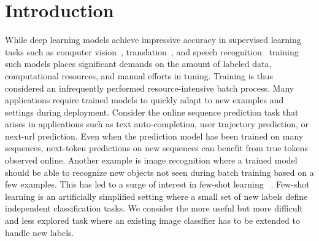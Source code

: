 \documentclass[letterpaper]{article} %
\begin{document}


\section{Introduction}

While deep learning models achieve impressive accuracy in supervised learning tasks such as computer vision~\cite{Krizhevsky_imagenetclassification},  translation~\cite{WuGNMT16}, and speech recognition~\cite{Yu14ASR} training such models places significant demands on the  amount of labeled data, computational resources, and manual efforts in tuning.  Training is thus considered an infrequently performed resource-intensive batch process.
%
Many applications require trained models to quickly adapt to new examples and settings during deployment. Consider the online sequence prediction task that arises in applications such as text auto-completion, user trajectory prediction, or next-url prediction.  Even when the prediction model has been trained on many sequences, next-token predictions on new sequences can benefit from true tokens observed online.
Another example is image recognition where a trained model should be able to recognize new objects not seen during batch training based on a few examples. This has led to a surge of interest in  few-shot learning ~\cite{kaiser2017,SantoroBBWL16,VinyalsBLKW16,zemel17}. Few-shot learning is an artificially simplified setting where a small set of new labels define independent classification tasks. We consider the more useful but more difficult and less explored task where an existing image classifier has to be extended to handle new labels.





%
%
\end{document}
